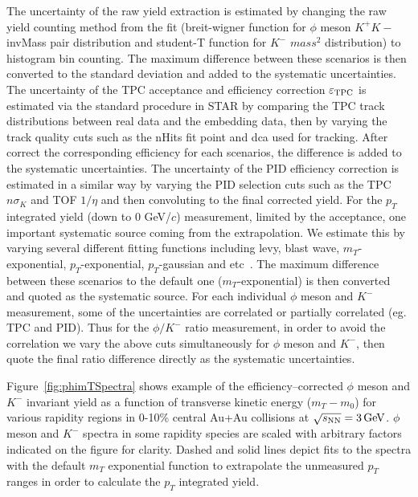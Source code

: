 \documentclass[%
 reprint,	
showpacs,
 amsmath,amssymb,
 aps,
 prc,
]{revtex4-1}
\begin{document}
The uncertainty of the raw yield extraction is estimated by changing the raw yield counting method from the fit (breit-wigner function for $\phi$ meson $K^+K-$ invMass pair distribution and student-T function for $K^-$ $mass^2$ distribution) to histogram bin counting. The maximum difference between these scenarios is then converted to the standard deviation and added to the systematic uncertainties. The uncertainty of the TPC acceptance and efficiency correction $\varepsilon_{\rm TPC}$ is estimated via the standard procedure in STAR by comparing the TPC track distributions between real data and the embedding data, then by varying the track quality cuts such as the nHits fit point and dca used for tracking. After correct the corresponding efficiency for each scenarios, the difference is added to the systematic uncertainties. The uncertainty of the PID efficiency correction is estimated in a similar way by varying the PID selection cuts such as the TPC $n\sigma_{K}$ and TOF $1/\eta$ and then convoluting to the final corrected yield. For the $p_T$ integrated yield (down to 0 GeV/$c$) measurement, limited by the acceptance, one important systematic source coming from the extrapolation. We estimate this by varying several different fitting functions including levy, blast wave, $m_T$-exponential, $p_T$-exponential, $p_T$-gaussian and etc~\cite{PhysRevC.79.034909}. The maximum difference between these scenarios to the default one ($m_T$-exponential) is then converted and quoted as the systematic source. For each individual $\phi$ meson and $K^-$ measurement, some of the uncertainties are correlated or partially correlated (eg. TPC and PID). Thus for the $\phi/K^-$ ratio measurement, in order to avoid the correlation we vary the above cuts simultaneously for $\phi$ meson and $K^-$, then quote the final ratio difference directly as the systematic uncertainties.


Figure~\ref{fig:phimTSpectra} shows example of the efficiency--corrected $\phi$ meson and $K^-$ invariant yield as a function of transverse kinetic energy ($m_T-m_0$) for various rapidity regions in 0-10\% central Au+Au collisions at ${\sqrt{s_{\rm NN}} = \rm{3\,GeV}}$. $\phi$ meson and $K^-$ spectra in some rapidity species are scaled with arbitrary factors indicated on the figure for clarity. Dashed and solid lines depict fits to the spectra with the default $m_T$ exponential function to extrapolate the unmeasured $p_T$ ranges in order to calculate the $p_T$ integrated yield.
\end{document}
